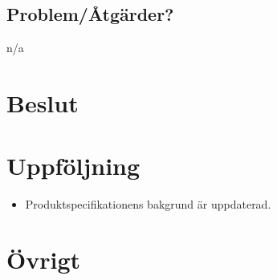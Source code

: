 \subsection*{Problem/Åtgärder?}
n/a

\section*{Beslut}

\section*{Uppföljning}
\begin{itemize}
    \item Produktspecifikationens bakgrund är uppdaterad.
\end{itemize}

\section*{Övrigt}